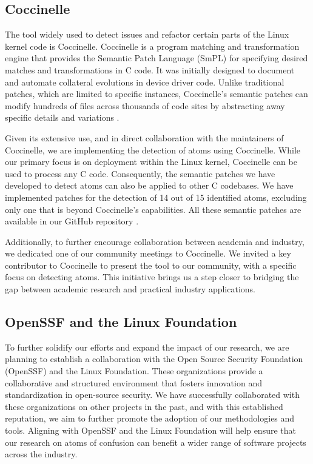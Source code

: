\documentclass[conference]{IEEEtran}
\begin{document}
\subsection{Coccinelle}

The tool widely used to detect issues and refactor certain 
parts of the Linux kernel code is Coccinelle. Coccinelle is a 
program matching and transformation engine that provides the 
Semantic Patch Language (SmPL) for specifying desired matches 
and transformations in C code. It was initially designed to 
document and automate collateral evolutions in device driver 
code. Unlike traditional patches, which are limited to 
specific instances, Coccinelle's semantic patches can modify 
hundreds of files across thousands of code sites by 
abstracting away specific details and variations \cite{coccinelle}.

Given its extensive use, and in direct collaboration with the 
maintainers of Coccinelle, we are implementing the detection 
of atoms using Coccinelle. While our primary focus is on 
deployment within the Linux kernel, Coccinelle can be used to 
process any C code. Consequently, the semantic patches we have 
developed to detect atoms can also be applied to other C 
codebases. We have implemented patches for the detection of 14 
out of 15 identified atoms, excluding only one that is beyond 
Coccinelle's capabilities. All these semantic patches are available in our GitHub repository \cite{githubcocci}. 

Additionally, to further encourage collaboration between 
academia and industry, we dedicated one of our community 
meetings to Coccinelle. We invited a key contributor to 
Coccinelle to present the tool to our community, with a 
specific focus on detecting atoms. This initiative brings us a 
step closer to bridging the gap between academic research and 
practical industry applications.

\subsection{OpenSSF and the Linux Foundation}

To further solidify our efforts and expand the impact of our 
research, we are planning to establish a collaboration with 
the Open Source Security Foundation (OpenSSF) and the Linux 
Foundation. These organizations provide a collaborative and 
structured environment that fosters innovation and 
standardization in open-source security. We have successfully 
collaborated with these organizations on other projects in the 
past, and with this established reputation, we aim to further 
promote the adoption of our methodologies and tools. Aligning 
with OpenSSF and the Linux Foundation will help ensure that 
our research on atoms of confusion can benefit a wider range 
of software projects across the industry.


{\scriptsize  }
\end{document}
